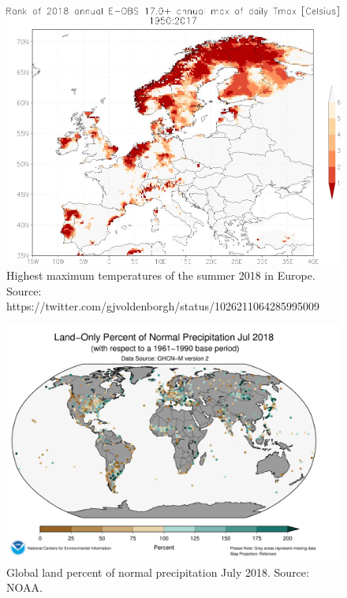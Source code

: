 \documentclass[a4paper, article, oneside, UKenglish]{memoir}
\newcommand{\0}{\mathbf{0}}
\newcommand{\1}{\mathbf{1}}
\begin{document}
\begin{figure}
    \centering
    \includegraphics[scale=0.3]{NOAA/Highest_maximum_temperature_of_the_summer_2018_August_in_Europe.jpg}
    \caption{Highest maximum temperatures of the summer 2018 in Europe. Source: https://twitter.com/gjvoldenborgh/status/1026211064285995009}
    \label{fig:highest_temp}
\end{figure}

\begin{figure}
    \centering
    \includegraphics[scale=0.3]{NOAA/dry_anomalies.png}
    \caption{Global land percent of normal precipitation July 2018. Source: NOAA.}
    \label{fig:precipitation_percent}
\end{figure}
\end{document}
